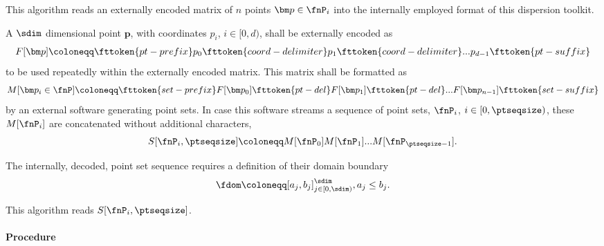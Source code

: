 %
This algorithm reads an externally encoded matrix of $n$ points $\bm p \in \fnP_i$ into the internally employed format of this dispersion toolkit.

A $\sdim$ dimensional point $\bm p$, with coordinates $p_i$, $i \in [0,d)$, shall be externally encoded as
\begin{align*}
  F[\bm p] \coloneqq \fttoken{pt-prefix}p_0\fttoken{coord-delimiter}p_1\fttoken{coord-delimiter}...p_{d-1}\fttoken{pt-suffix}
\end{align*}
to be used repeatedly within the externally encoded matrix. This matrix shall be formatted as
\begin{align*}
  M[\bm p_i \in \fnP] \coloneqq \fttoken{set-prefix}F[\bm p_0]\fttoken{pt-del}F[\bm p_1]\fttoken{pt-del}...F[\bm p_{n-1}]\fttoken{set-suffix}
\end{align*}
by an external software generating point sets. In case this software streams a sequence of point sets, $\fnP_i$, $i \in [0,\ptseqsize)$, these $M[\fnP_i]$ are concatenated without additional characters,
\begin{align*}
  S[\fnP_i, \ptseqsize] \coloneqq M[\fnP_0]M[\fnP_1]...M[\fnP_{\ptseqsize-1}].
\end{align*}

The internally, decoded, point set sequence requires a definition of their domain boundary
\begin{align*}
  \fdom \coloneqq [a_j, b_j]^{\sdim}_{j \in [0,\sdim)}, a_j \leq b_j.
\end{align*}

This algorithm reads $S[\fnP_i, \ptseqsize]$.

\paragraph{Procedure}

\begin{synopsis}
\end{synopsis}

